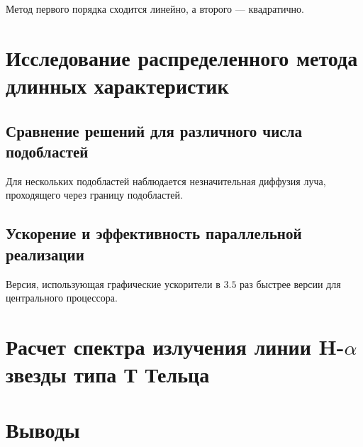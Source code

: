 Метод первого порядка сходится линейно, а второго --- квадратично.

\section{Исследование распределенного метода длинных характеристик}

\subsection{Сравнение решений для различного числа подобластей}

Для нескольких подобластей наблюдается незначительная диффузия луча, проходящего через границу подобластей.

\subsection{Ускорение и эффективность параллельной реализации}

Версия, использующая графические ускорители в $3.5$ раз быстрее версии для центрального процессора.

\section{Расчет спектра излучения линии H-$\alpha$ звезды типа Т Тельца}

\section{Выводы}

